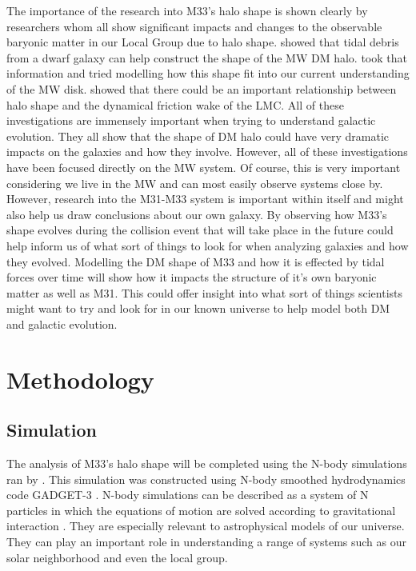 \documentclass[usenatbib]{mnras}
\begin{document}
The importance of the research into M33's halo shape is shown clearly by researchers \cite{Law10, Debattista_2013, Garavito-Camargo_2021} whom all show significant impacts and changes to the observable baryonic matter in our Local Group due to halo shape. \cite{Law10} showed that tidal debris from a dwarf galaxy can help construct the shape of the MW DM halo. \cite{Debattista_2013} took that information and tried modelling how this shape fit into our current understanding of the MW disk. \cite{Garavito-Camargo_2021} showed that there could be an important relationship between halo shape and the dynamical friction wake of the LMC. All of these investigations are immensely important when trying to understand galactic evolution. They all show that the shape of DM halo could have very dramatic impacts on the galaxies and how they involve. However, all of these investigations have been focused directly on the MW system. Of course, this is very important considering we live in the MW and can most easily observe systems close by. However, research into the M31-M33 system is important within itself and might also help us draw conclusions about our own galaxy. By observing how M33's shape evolves during the collision event that will take place in the future could help inform us of what sort of things to look for when analyzing galaxies and how they evolved. Modelling the DM shape of M33 and how it is effected by tidal forces over time will show how it impacts the structure of it's own baryonic matter as well as M31. This could offer insight into what sort of things scientists might want to try and look for in our known universe to help model both DM and galactic evolution. 


\section{Methodology} \label{Method}
\subsection{Simulation}
The analysis of M33's halo shape will be completed using the N-body simulations ran by \cite{vdm12}. This simulation was constructed using N-body smoothed hydrodynamics code GADGET-3 \citep{Springel_2005}. N-body simulations can be described as a system of N particles in which the equations of motion are solved according to gravitational interaction \citep{Trenti08}. They are especially relevant to astrophysical models of our universe. They can play an important role in understanding a range of systems such as our solar neighborhood and even the local group.
\end{document}
